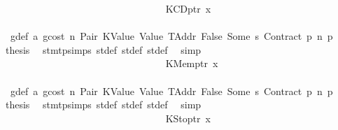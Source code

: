 \begin{isabellebody}
\isanewline
\ \ \ \ \ \ \ \ \ \ \ \ \ \ \ \ \ \ \ \ \ \ \ \ \ \ \ \ \ \ \ \ \isamarkupfalse%
\ {\isacharparenleft}{\kern0pt}KCDptr\ x{}{\isacharparenright}{\kern0pt}\isanewline
\ \ \ \ \ \ \ \ \ \ \ \ \ \ \ \ \ \ \ \ \ \ \ \ \ \ \ \ \ \ \ \ \isamarkupfalse%
\ {}{\isacharparenleft}{\kern0pt}{}{\isacharparenright}{\kern0pt}\ g{\isacharunderscore}{\kern0pt}def\ a{}\ gcost\ n\ Pair\ KValue\ Value\ TAddr\ False\ Some\ s{}\ Contract\ p{}\ n{}\ p{}\ \isamarkupfalse%
\ {\isacharquery}{\kern0pt}thesis\ \isamarkupfalse%
\ stmt{\isachardot}{\kern0pt}psimps{\isacharparenleft}{\kern0pt}{}{\isacharparenright}{\kern0pt}\ st{\isacharprime}{\kern0pt}{\isacharunderscore}{\kern0pt}def\ st{\isacharprime}{\kern0pt}{\isacharprime}{\kern0pt}{\isacharunderscore}{\kern0pt}def\ st{\isacharprime}{\kern0pt}{\isacharprime}{\kern0pt}{\isacharprime}{\kern0pt}{\isacharunderscore}{\kern0pt}def\ \isamarkupfalse%
\ simp\isanewline
\ \ \ \ \ \ \ \ \ \ \ \ \ \ \ \ \ \ \ \ \ \ \ \ \ \ \ \ \ \ \isamarkupfalse%
\isanewline
\ \ \ \ \ \ \ \ \ \ \ \ \ \ \ \ \ \ \ \ \ \ \ \ \ \ \ \ \ \ \ \ \isamarkupfalse%
\ {\isacharparenleft}{\kern0pt}KMemptr\ x{}{\isacharparenright}{\kern0pt}\isanewline
\ \ \ \ \ \ \ \ \ \ \ \ \ \ \ \ \ \ \ \ \ \ \ \ \ \ \ \ \ \ \ \ \isamarkupfalse%
\ {}{\isacharparenleft}{\kern0pt}{}{\isacharparenright}{\kern0pt}\ g{\isacharunderscore}{\kern0pt}def\ a{}\ gcost\ n\ Pair\ KValue\ Value\ TAddr\ False\ Some\ s{}\ Contract\ p{}\ n{}\ p{}\ \isamarkupfalse%
\ {\isacharquery}{\kern0pt}thesis\ \isamarkupfalse%
\ stmt{\isachardot}{\kern0pt}psimps{\isacharparenleft}{\kern0pt}{}{\isacharparenright}{\kern0pt}\ st{\isacharprime}{\kern0pt}{\isacharunderscore}{\kern0pt}def\ st{\isacharprime}{\kern0pt}{\isacharprime}{\kern0pt}{\isacharunderscore}{\kern0pt}def\ st{\isacharprime}{\kern0pt}{\isacharprime}{\kern0pt}{\isacharprime}{\kern0pt}{\isacharunderscore}{\kern0pt}def\ \isamarkupfalse%
\ simp\isanewline
\ \ \ \ \ \ \ \ \ \ \ \ \ \ \ \ \ \ \ \ \ \ \ \ \ \ \ \ \ \ \isamarkupfalse%
\isanewline
\ \ \ \ \ \ \ \ \ \ \ \ \ \ \ \ \ \ \ \ \ \ \ \ \ \ \ \ \ \ \ \ \isamarkupfalse%
\ {\isacharparenleft}{\kern0pt}KStoptr\ x{}{\isacharparenright}{\kern0pt}\isanewline

\end{isabellebody}
